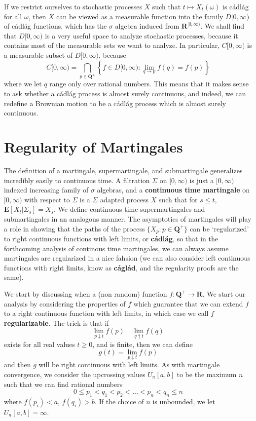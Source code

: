 If we restrict ourselves to stochastic processes $X$ such that $t \mapsto X_t(\omega)$ is c\'{a}dl\'{a}g for all $\omega$, then $X$ can be viewed as a measurable function into the family $D[0,\infty)$ of c\'{a}dl\'{a}g functions, which has the $\sigma$ algebra induced from $\mathbf{R}^{[0,\infty)}$. We shall find that $D[0,\infty)$ is a very useful space to analyze stochastic processes, because it contains most of the measurable sets we want to analyze. In particular, $C[0,\infty)$ is a measurable subset of $D[0,\infty)$, because
%
\[ C[0,\infty) = \bigcap_{p \in \mathbf{Q}^+} \left\{ f \in D[0,\infty): \lim_{q \to p} f(q) = f(p) \right\} \]
%
where we let $q$ range only over rational numbers. This means that it makes sense to ask whether a c\'{a}dl\'{a}g process is almost surely continuous, and indeed, we can redefine a Brownian motion to be a c\'{a}dl\'{a}g process which is almost surely continuous.

\section{Regularity of Martingales}

The definition of a martingale, supermartingale, and submartingale generalizes incredibly easily to continuous time. A filtration $\Sigma$ on $[0,\infty)$ is just a $[0,\infty)$ indexed increasing family of $\sigma$ algebras, and a {\bf continuous time martingale} on $[0,\infty)$ with respect to $\Sigma$ is a $\Sigma$ adapted process $X$ such that for $s \leq t$, $\mathbf{E}[X_t|\Sigma_s] = X_s$. We define continuous time supermartingales and submartingales in an analogous manner. The asymptotics of martingales will play a role in showing that the paths of the process $\{ X_p: p \in \mathbf{Q}^+ \}$ can be `regularized' to right continuous functions with left limits, or {\bf c\'{a}dl\'{a}g}, so that in the forthcoming analysis of continous time martingales, we can always assume martingales are regularized in a nice fahsion (we can also consider left continuous functions with right limits, know as {\bf c\'{a}gl\'{a}d}, and the regularity proofs are the same).

We start by discussing when a (non random) function $f: \mathbf{Q}^+ \to \mathbf{R}$. We start our analysis by considering the properties of $f$ which guarantee that we can extend $f$ to a right continuous function with left limits, in which case we call $f$ {\bf regularizable}. The trick is that if
%
\[ \lim_{p \downarrow t} f(p)\ \ \ \ \ \lim_{q \uparrow t} f(q) \]
%
exists for all real values $t \geq 0$, and is finite, then we can define
%
\[ g(t) = \lim_{p \downarrow t} f(p) \]
%
and then $g$ will be right continuous with left limits. As with martingale convergence, we consider the upcrossing values $U_n[a,b]$ to be the maximum $n$ such that we can find rational numbers
%
\[ 0 \leq p_1 < q_1 < p_2 < \dots < p_n < q_n \leq n \]
%
where $f(p_i) < a$, $f(q_i) > b$. If the choice of $n$ is unbounded, we let $U_n[a,b] = \infty$.

